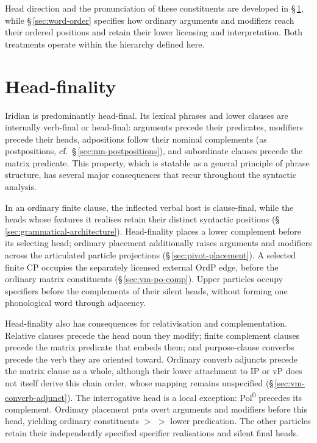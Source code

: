 Head direction and the pronunciation of these constituents are developed in
§\,\ref{sec:th-head-finality}, while §\,\ref{sec:word-order} specifies
how ordinary arguments and modifiers reach their ordered positions and
retain their lower licensing and interpretation. Both treatments operate
within the hierarchy defined here.

\FloatBarrier

\section{Head-finality}
\label{sec:th-head-finality}

Iridian is predominantly head-final. Its lexical phrases and lower clauses are
internally verb-final or head-final: arguments precede their predicates,
modifiers precede their heads, adpositions follow their nominal complements (as
postpositions, cf.\ §\,\ref{sec:nm-postpositions}), and subordinate clauses precede
the matrix predicate. This property, which is statable as a general principle of
phrase structure, has several major
consequences that recur throughout the syntactic analysis.

In an ordinary finite clause, the inflected verbal host is clause-final,
while the heads whose features it realises retain their distinct syntactic
positions (§\,\ref{sec:grammatical-architecture}). Head-finality places a
lower complement before its selecting head; ordinary placement additionally
raises arguments and modifiers across the articulated particle projections
(§\,\ref{sec:pivot-placement}). A selected finite CP occupies the separately
licensed external OrdP edge, before the ordinary matrix constituents
(§\,\ref{sec:vm-po-comp}). Upper particles occupy specifiers before the
complements of their silent heads, without forming one phonological word
through adjacency.

Head-finality also has consequences for relativisation and complementation.
Relative clauses precede the head noun they modify; finite complement clauses
precede the matrix predicate that embeds them; and purpose-clause converbs
precede the verb they are oriented toward. Ordinary converb adjuncts precede
the matrix clause as a whole, although their lower attachment to IP or vP
does not itself derive this chain order, whose mapping remains unspecified
(§\,\ref{sec:vm-converb-adjunct}). The interrogative head
 is a local exception: Pol\textsuperscript{0} precedes its
complement. Ordinary placement puts overt arguments and modifiers before
this head, yielding ordinary constituents $>$  $>$ lower
predication. The other particles retain their independently specified
specifier realisations and silent final heads.

